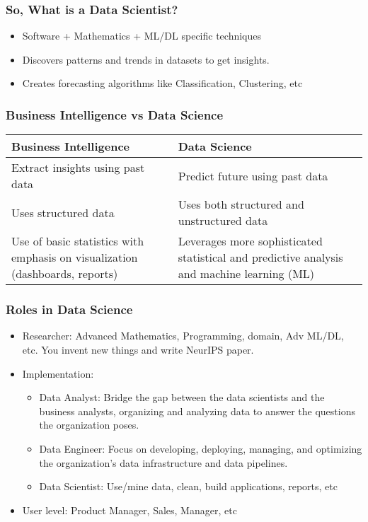 \begin{frame}[fragile]\frametitle{So, What is a Data Scientist?}
\begin{itemize}
\item Software + Mathematics + ML/DL specific techniques
\item Discovers patterns and trends in datasets to get insights.
\item Creates forecasting algorithms like Classification, Clustering, etc
\end{itemize}
\end{frame}

\begin{frame}[fragile]\frametitle{Business Intelligence vs Data Science}
\begin{table}[]
\begin{tabular}{p{}p{}}
\hline
{\bf Business Intelligence} & {\bf Data Science}         	\\ \hline
Extract insights using past data    & Predict future using past data       		\\ \hline
Uses structured data      & Uses both structured and unstructured data  				\\ \hline
Use of basic statistics with emphasis on visualization (dashboards, reports)    & Leverages more sophisticated statistical and predictive analysis and machine learning (ML)            	\\ \hline
\end{tabular}
\end{table}
\end{frame}

\begin{frame}[fragile]\frametitle{Roles in Data Science}
\begin{itemize}
\item Researcher: Advanced Mathematics, Programming, domain, Adv ML/DL, etc. You invent new things and write NeurIPS paper.
\item Implementation:
	\begin{itemize}
	\item Data Analyst: Bridge the gap between the data scientists and the business analysts, organizing and analyzing data to answer the questions the organization poses. 
	\item Data Engineer: Focus on developing, deploying, managing, and optimizing the organization’s data infrastructure and data pipelines.
	\item Data Scientist: Use/mine data, clean, build applications, reports, etc
	\end{itemize}
\item User level: Product Manager, Sales, Manager, etc
\end{itemize}
\end{frame}

